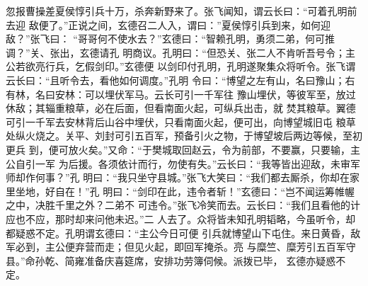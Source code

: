 忽报曹操差夏侯惇引兵十万，杀奔新野来了。张飞闻知，谓云长曰：“可着孔明前去迎
敌便了。”正说之间，玄德召二人入，谓曰：”夏侯惇引兵到来，如何迎敌？”张飞曰：
“哥哥何不使水去？”玄德曰：“智赖孔明，勇须二弟，何可推调？”关、张出，玄德请孔
明商议。孔明曰：“但恐关、张二人不肯听吾号令；主公若欲亮行兵，乞假剑印。”玄德便
以剑印付孔明，孔明遂聚集众将听令。张飞谓云长曰：“且听令去，看他如何调度。”孔明
令曰：“博望之左有山，名曰豫山；右有林，名曰安林：可以埋伏军马。云长可引一千军往
豫山埋伏，等彼军至，放过休敌；其辎重粮草，必在后面，但看南面火起，可纵兵出击，就
焚其粮草。翼德可引一千军去安林背后山谷中埋伏，只看南面火起，便可出，向博望城旧屯
粮草处纵火烧之。关平、刘封可引五百军，预备引火之物，于博望坡后两边等候，至初更兵
到，便可放火矣。”又命：“于樊城取回赵云，令为前部，不要赢，只要输，主公自引一军
为后援。各须依计而行，勿使有失。”云长曰：“我等皆出迎敌，未审军师却作何事？”孔
明曰：“我只坐守县城。”张飞大笑曰：“我们都去厮杀，你却在家里坐地，好自在！”孔
明曰：“剑印在此，违令者斩！”玄德曰：“岂不闻运筹帷幄之中，决胜千里之外？二弟不
可违令。”张飞冷笑而去。云长曰：“我们且看他的计应也不应，那时却来问他未迟。”二
人去了。众将皆未知孔明韬略，今虽听令，却都疑惑不定。孔明谓玄德曰：“主公今日可便
引兵就博望山下屯住。来日黄昏，敌军必到，主公便弃营而走；但见火起，即回军掩杀。亮
与糜竺、糜芳引五百军守县。”命孙乾、简雍准备庆喜筵席，安排功劳簿伺候。派拨已毕，
玄德亦疑惑不定。

